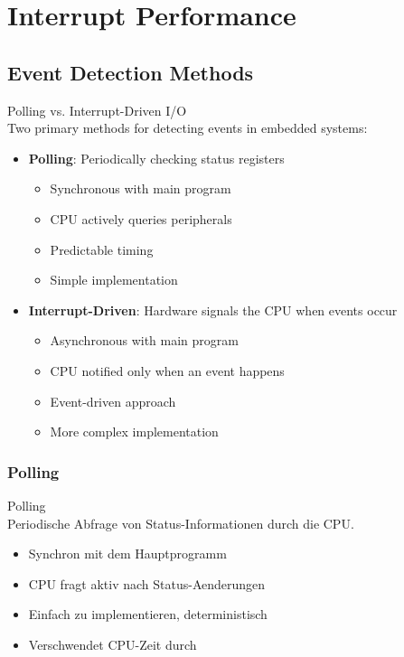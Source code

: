 \section{Interrupt Performance}

\subsection{Event Detection Methods}

\begin{theorem}{Polling vs. Interrupt-Driven I/O}\\
Two primary methods for detecting events in embedded systems:
\begin{itemize}
    \item \textbf{Polling}: Periodically checking status registers
    \begin{itemize}
        \item Synchronous with main program
        \item CPU actively queries peripherals
        \item Predictable timing
        \item Simple implementation
    \end{itemize}
    \item \textbf{Interrupt-Driven}: Hardware signals the CPU when events occur
    \begin{itemize}
        \item Asynchronous with main program
        \item CPU notified only when an event happens
        \item Event-driven approach
        \item More complex implementation
    \end{itemize}
\end{itemize}
\end{theorem}

\subsubsection{Polling}

\begin{definition}{Polling}\\
    Periodische Abfrage von Status-Informationen durch die CPU.
    \begin{itemize}
        \item Synchron mit dem Hauptprogramm
        \item CPU fragt aktiv nach Status-Aenderungen
        \item Einfach zu implementieren, deterministisch
        \item Verschwendet CPU-Zeit durch 
    \end{itemize}
\end{definition}


